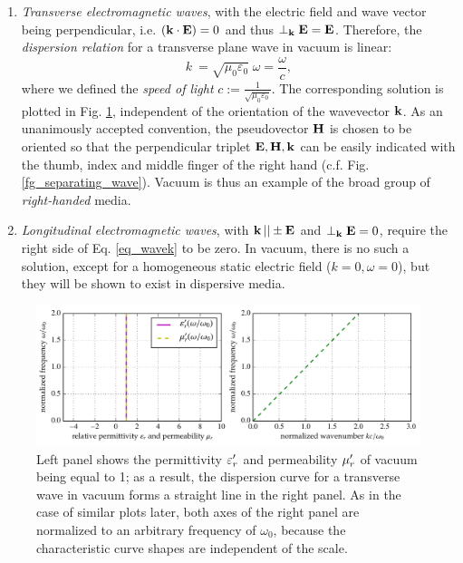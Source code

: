 \begin{enumerate}
 \item{\textit{Transverse electromagnetic waves}, with the electric field and wave vector being perpendicular, i.e. $({\mathbf{k}} \cdot \mathbf{E}) = 0$ and thus $\perp_{\mathbf{k}}\mathbf{E} = \mathbf{E}$. Therefore, the \textit{dispersion relation} for a transverse plane wave in vacuum is linear:
\begin{equation} k~= \sqrt{\mu_0 \varepsilon_0}\; \omega = \frac{\omega}{c}, \label{eq_dispeq_vac}\end{equation}
	where we defined the \textit{speed of light} $c := \frac{1}{\sqrt{\mu_0 \varepsilon_0}}$. The corresponding solution is plotted in Fig. \ref{fg_dcvac}, independent of the orientation of the wavevector ${\mathbf{k}}$. As an unanimously accepted convention, the pseudovector $\mathbf{H}$ is chosen to be oriented so that the perpendicular triplet $\mathbf{E},\mathbf{H},{\mathbf{k}}$ can be easily indicated with the thumb, index and middle finger of the right hand (c.f. Fig. \ref{fg_separating_wave}). Vacuum is thus an example of the broad group of \textit{right-handed} media.
} 
 \item{\textit{Longitudinal electromagnetic waves}, with ${\mathbf{k}}\,|| \pm \mathbf{E}$ and $\perp_{\mathbf{k}}\mathbf{E} = 0$, require the right side of Eq. \ref{eq_wavek} to be zero. In vacuum, there is no such a solution, except for a homogeneous static electric field ($k = 0, \omega = 0$), but they will be shown to exist in dispersive media.} 
 \end{enumerate}

 \begin{figure}[t] \caption{Left panel shows the permittivity $\varepsilon_r'$ and permeability $\mu_r'$ of vacuum being equal to 1; as a result, the dispersion curve for a transverse wave in vacuum forms a straight line in the right panel. As in the case of similar plots later, both axes of the right panel are normalized to an arbitrary frequency of $\omega_0$, because the characteristic curve shapes are independent of the scale.} \label{fg_dcvac} \centering 
	\includegraphics[width=\textwidth]{img/dispersion_landau_lifshitz/dispersion_vacuum.pdf}
\end{figure}

